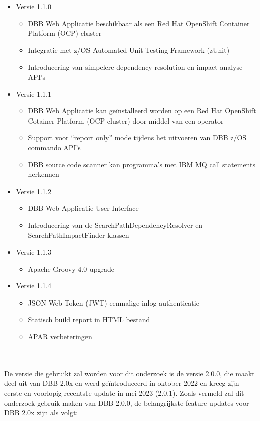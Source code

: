 \begin{itemize}
    \item Versie 1.1.0
    \begin{itemize}
        \item DBB Web Applicatie beschikbaar als een Red Hat OpenShift Container Platform (OCP) cluster
        \item Integratie met z/OS Automated Unit Testing Framework (zUnit)
        \item Introducering van simpelere dependency resolution en impact analyse API's
    \end{itemize}
    \item Versie 1.1.1
    \begin{itemize}
        \item DBB Web Applicatie kan geïnstalleerd worden op een Red Hat OpenShift Cotainer Platform (OCP cluster) door middel van een operator
        \item Support voor \enquote{report only} mode tijdens het uitvoeren van DBB z/OS commando API's
        \item DBB source code scanner kan programma's met IBM MQ call statements herkennen
    \end{itemize}
    \item Versie 1.1.2
    \begin{itemize}
        \item DBB Web Applicatie User Interface
        \item Introducering van de SearchPathDependencyResolver en SearchPathImpactFinder klassen
    \end{itemize}
    \item Versie 1.1.3
    \begin{itemize}
        \item Apache Groovy 4.0 upgrade
    \end{itemize}
    \item Versie 1.1.4
    \begin{itemize}
        \item JSON Web Token (JWT) eenmalige inlog authenticatie
        \item Statisch build report in HTML bestand
        \item APAR verbeteringen
    \end{itemize}
\end{itemize}
\autocite{IBM2023}
\\ \\
De versie die gebruikt zal worden voor dit onderzoek is de versie 2.0.0, die maakt deel uit van DBB 2.0x en werd geïntroduceerd in oktober 2022 en kreeg zijn eerste en voorlopig recentste update in mei 2023 (2.0.1). Zoals vermeld zal dit onderzoek gebruik maken van DBB 2.0.0, de belangrijkste feature updates voor DBB 2.0x zijn als volgt:
